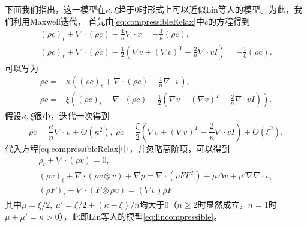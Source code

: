 下面我们指出，这一模型在$\kappa,\xi$趋于$0$时形式上可以近似Lin等人的模型。为此，我们利用Maxwell迭代，
首先由\eqref{eq:compressibleRelax}中$c$的方程得到
\begin{eqnarray*}
    (\rho \dot{c})_t + \nabla \cdot (\rho \dot{c}) -  \frac{1}{n} \nabla \cdot v  = - \frac{1}{\kappa} (\rho  \dot{c}), \\
    (\rho \mathring{c})_t + \nabla \cdot (\rho \mathring{c}) -  \frac{1}{2} (\nabla v + (\nabla v)^T  - \frac{2}{n} \nabla \cdot v I)  = - \frac{1}{\xi} (\rho  \mathring{c}).
\end{eqnarray*}
可以写为
\begin{eqnarray*}
    \rho \dot{c} = - \kappa\left( (\rho \dot{c})_t + \nabla \cdot (\rho \dot{c}) - \frac{1}{n} \nabla \cdot v\right), \\
    \rho \mathring{c} = - \xi \left( (\rho \mathring{c})_t + \nabla \cdot (\rho \mathring{c}) -  \frac{1}{2} (\nabla v + (\nabla v)^T  - \frac{2}{n} \nabla \cdot v I) \right).
\end{eqnarray*}
假设$\kappa,\xi$很小，迭代一次得到
\begin{equation*}
    \rho \dot{c} = \frac{\kappa}{n} \nabla \cdot v + O(\kappa^2), \ \rho \mathring{c} =  \frac{\xi}{2} (\nabla v + (\nabla v)^T  - \frac{2}{n} \nabla \cdot v I) + O(\xi^2).
\end{equation*}
代入方程\eqref{eq:compressibleRelax}中，并忽略高阶项，可以得到
\begin{subequations}\label{eq:compressible}
  \begin{align}
  \rho_t + \nabla \cdot (\rho  v ) = 0, \\
  (\rho  v )_t + \nabla \cdot ( \rho  v  \otimes  v ) + \nabla p = \nabla \cdot (\rho F F^T) + \mu \Delta  v  + \mu' \nabla \nabla \cdot  v , \\
  (\rho F)_t + \nabla \cdot (F \otimes \rho  v ) = (\nabla  v ) \rho F
\end{align}
\end{subequations}
其中$\mu = \xi/2,\ \mu'=\xi/2 + (\kappa - \xi)/n$均大于$0$（$n\ge 2$时显然成立，$n=1$时$\mu + \mu' = \kappa>0$），此即Lin等人的模型\eqref{eq:lincompressible}\cite{lin2005hydrodynamics,lei2008global}。

